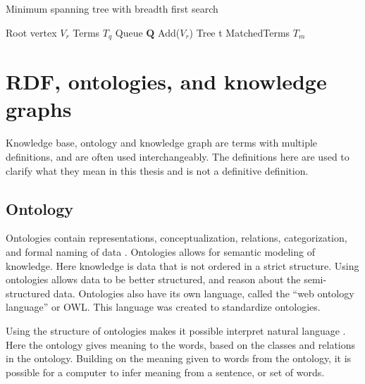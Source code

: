 \begin{algorithm}[H]
    \caption{Minimum spanning tree with breadth first search}
    \label{MinTreeBFS}
    \SetAlgoLined
    Root vertex $V_r$\; Terms $T_q$\; Queue $\mathbf{Q}$ Add($V_r$)\; Tree t\; MatchedTerms $T_m$\;
\end{algorithm}

\section{RDF, ontologies, and knowledge graphs}
Knowledge base, ontology and knowledge graph are terms with multiple definitions, and are often used interchangeably. The definitions here are used to clarify what they mean in this thesis and is not a definitive definition.

\subsection{Ontology}
Ontologies contain representations, conceptualization, relations, categorization, and formal naming of data \cite{davies2006semantic}. Ontologies allows for semantic modeling of knowledge. Here knowledge is data that is not ordered in a strict structure. Using ontologies allows data to be better structured, and reason about the semi-structured data. Ontologies also have its own language, called the ``web ontology language'' or OWL. This language was created to standardize ontologies.

Using the structure of ontologies makes it possible interpret natural language \cite{cimiano2014ontology}. Here the ontology gives meaning to the words, based on the classes and relations in the ontology. Building on the meaning given to words from the ontology, it is possible for a computer to infer meaning from a sentence, or set of words.

